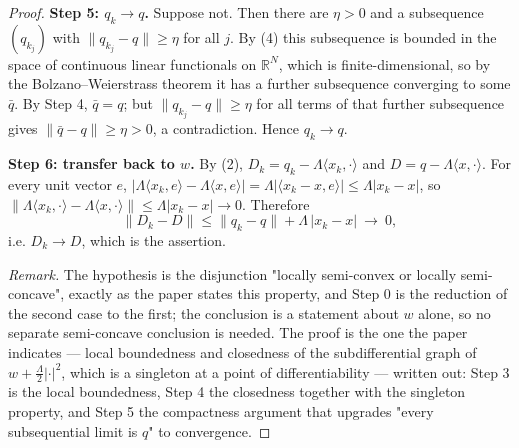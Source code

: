 \begin{proof}
\medskip\noindent\textbf{Step 5: $q_k\to q$.} Suppose not. Then there are $\eta>0$ and a
subsequence $(q_{k_j})$ with $\|q_{k_j}-q\|\ge\eta$ for all $j$. By (4) this subsequence is
bounded in the space of continuous linear functionals on $\mathbb R^{N}$, which is
finite-dimensional, so by the Bolzano--Weierstrass theorem it has a further subsequence
converging to some $\bar q$. By Step 4, $\bar q=q$; but $\|q_{k_j}-q\|\ge\eta$ for all terms
of that further subsequence gives $\|\bar q-q\|\ge\eta>0$, a contradiction. Hence
$q_k\to q$.

\medskip\noindent\textbf{Step 6: transfer back to $w$.} By (2),
$D_k=q_k-\Lambda\langle x_k,\cdot\rangle$ and $D=q-\Lambda\langle x,\cdot\rangle$. For every
unit vector $e$,
$\big|\Lambda\langle x_k,e\rangle-\Lambda\langle x,e\rangle\big|
 =\Lambda\big|\langle x_k-x,e\rangle\big|\le\Lambda|x_k-x|$, so
$\big\|\Lambda\langle x_k,\cdot\rangle-\Lambda\langle x,\cdot\rangle\big\|\le\Lambda|x_k-x|\to0$.
Therefore
\[
 \|D_k-D\|\le\|q_k-q\|+\Lambda\,|x_k-x|\ \longrightarrow\ 0 ,
\]
i.e. $D_k\to D$, which is the assertion.

\medskip\noindent\emph{Remark.} The hypothesis is the disjunction "locally semi-convex or
locally semi-concave", exactly as the paper states this property, and Step 0 is the reduction
of the second case to the first; the conclusion is a statement about $w$ alone, so no separate
semi-concave conclusion is needed. The proof is the one the paper indicates --- local
boundedness and closedness of the subdifferential graph of $w+\tfrac{\Lambda}{2}|\cdot|^{2}$,
which is a singleton at a point of differentiability --- written out: Step 3 is the local
boundedness, Step 4 the closedness together with the singleton property, and Step 5 the
compactness argument that upgrades "every subsequential limit is $q$" to convergence.
\end{proof}
